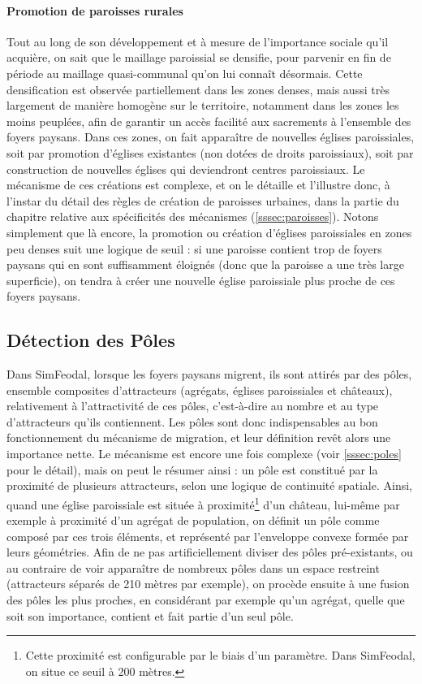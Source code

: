 \paragraph{Promotion de paroisses \og rurales\fg{}} Tout au long de son développement et à mesure de l'importance sociale qu'il acquière, on sait que le maillage paroissial se densifie, pour parvenir en fin de période au maillage quasi-communal qu'on lui connaît désormais. Cette densification est observée partiellement dans les zones denses, mais aussi très largement de manière homogène sur le territoire, notamment dans les zones les moins peuplées, afin de garantir un accès facilité aux sacrements à l'ensemble des foyers paysans.
Dans ces zones, on fait apparaître de nouvelles églises paroissiales, soit par promotion d'églises existantes (non dotées de droits paroissiaux), soit par construction de nouvelles églises qui deviendront centres paroissiaux.
Le mécanisme de ces créations est complexe, et on le détaille et l'illustre donc, à l'instar du détail des règles de création de paroisses \og urbaines\fg{}, dans la partie du chapitre relative aux spécificités des mécanismes (\cref{sssec:paroisses}).
Notons simplement que là encore, la promotion ou création d'églises paroissiales en zones peu denses suit une logique de seuil : si une paroisse contient trop de foyers paysans qui en sont suffisamment éloignés (donc que la paroisse a une très large superficie), on tendra à créer une nouvelle église paroissiale plus proche de ces foyers paysans.

\subsection{Détection des Pôles}

Dans SimFeodal, lorsque les foyers paysans migrent, ils sont attirés par des pôles, ensemble composites d'attracteurs (agrégats, églises paroissiales et châteaux), relativement à l'attractivité de ces pôles, c'est-à-dire au nombre et au type d'attracteurs qu'ils contiennent.
Les pôles sont donc indispensables au bon fonctionnement du mécanisme de migration, et leur définition revêt alors une importance nette.
Le mécanisme est encore une fois complexe (voir \cref{sssec:poles} pour le détail), mais on peut le résumer ainsi : un pôle est constitué par la proximité de plusieurs attracteurs, selon une logique de continuité spatiale.
Ainsi, quand une église paroissiale est située à proximité\footnote{
Cette proximité est configurable par le biais d'un paramètre.
Dans SimFeodal, on situe ce seuil à 200 mètres.
} d'un château, lui-même par exemple à proximité d'un agrégat de population, on définit un pôle comme composé par ces trois éléments, et représenté par l'enveloppe convexe formée par leurs géométries.
Afin de ne pas artificiellement diviser des pôles pré-existants, ou au contraire de voir apparaître de nombreux pôles dans un espace restreint (attracteurs séparés de 210 mètres par exemple), on procède ensuite à une fusion des pôles les plus proches, en considérant par exemple qu'un agrégat, quelle que soit son importance, contient et fait partie d'un seul pôle.

